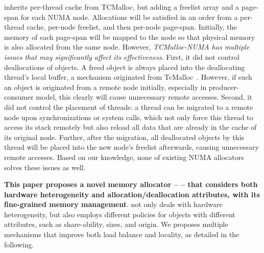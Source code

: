 \TN{} inherits per-thread cache from TCMalloc, but adding a freelist array and a page-span for each NUMA node. Allocations will be satisfied in an order from a per-thread cache, per-node freelist, and then per-node page-span. Initially, the memory of each page-span will be mapped to the node so that physical memory is also allocated from the same node. However, \textit{TCMalloc-NUMA has multiple issues that may significantly affect its effectiveness}. First, it did not control deallocations of objects. A freed object is always placed into the deallocating thread's local buffer, a mechanism originated from TcMalloc~\citep{tcmalloc}. However, if such an object is originated from a remote node initially, especially in producer-consumer model, this clearly will cause unnecessary remote accesses. Second, it did not control the placement of threads: a thread can be migrated to a remote node upon synchronizations or system calls, which not only force this thread to access its stack remotely but also reload all data that are already in the cache of its original node.  Further, after the migration, all deallocated objects by this thread will be placed into the new node's freelist afterwards, causing unnecessary remote accesses. Based on our knowledge, none of existing NUMA allocators solves these issues as well. 

\textbf{This paper proposes a novel memory allocator -- \NM{} -- that considers both hardware heterogeneity and allocation/deallocation attributes, with its fine-grained memory management}. \NM{} not only deals with hardware heterogeneity, but also employs different policies for objects with different attributes, such as share-ability, sizes, and origin. We proposes multiple mechanisms that improve both load balance and locality, as detailed in the following.   


